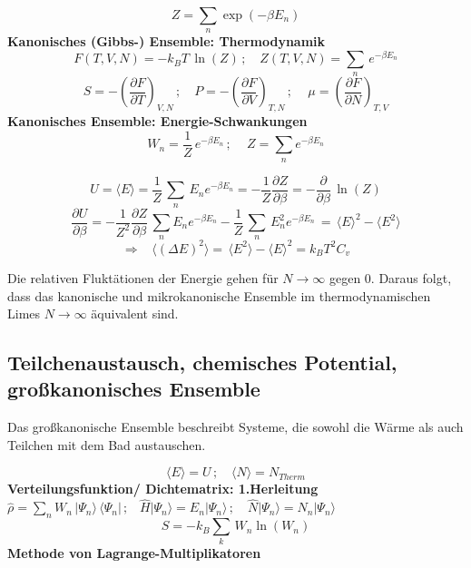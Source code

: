 \documentclass[a4paper,11pt]{scrartcl}
\begin{document}
$$ Z = \sum_n \exp(-\beta E_n) $$
\textbf{Kanonisches (Gibbs-) Ensemble: Thermodynamik}
\begin{equation}
 F(T,V,N) = - k_B T \, \ln(Z)\,; \,\,\,\,\,\, Z(T,V,N) = \sum_n \, e^{-\beta E_n}
\end{equation}
\begin{equation}
 S = - \left( \frac{\partial F}{\partial T} \right)_{V,N}\,;\,\,\,\,\,\, P = - \left( \frac{\partial F}{\partial V} \right)_{T,N}\,;\,\,\,\,\,\,\, \mu = \left( \frac{\partial F}{\partial N} \right)_{T,V}
\end{equation}
\textbf{Kanonisches Ensemble: Energie-Schwankungen}\\
\begin{equation}
 W_n= \frac{1}{Z}\, e^{-\beta E_n}\,;\,\,\,\,\,\,\, Z= \sum_n  e^{-\beta E_n}
\end{equation}

\begin{equation}
 U = \langle E \rangle = \frac{1}{Z} \, \sum_n \, E_n e^{-\beta E_n}= - \frac{1}{Z} \frac{\partial Z}{\partial \beta} =- \frac{\partial}{\partial \beta}\, \ln(Z)
\end{equation}
\begin{equation}
 \frac{\partial U}{\partial \beta} = - \frac{1}{Z^2} \frac{\partial Z}{\partial \beta}\, \sum_n E_n e^{-\beta E_n}- \frac{1}{Z} \, \sum_n \, E_n^2 e^{-\beta E_n}\, = \, \langle E \rangle^2- \langle E^2 \rangle
\end{equation}
\begin{equation}
 \Rightarrow \,\,\,\,\, \langle (\Delta E)^2 \rangle = \, \langle E^2 \rangle- \langle E \rangle^2 = k_B T^2 C_v
\end{equation}

Die relativen Fluktätionen der Energie gehen für $N \rightarrow \infty$ gegen 0.
Daraus folgt, dass das kanonische und mikrokanonische Ensemble im thermodynamischen Limes $N \rightarrow \infty$ äquivalent sind.
\subsection{Teilchenaustausch, chemisches Potential, großkanonisches Ensemble}
Das großkanonische Ensemble beschreibt Systeme, die sowohl die Wärme als auch Teilchen mit dem Bad austauschen.

$$\langle E \rangle = U\,; \,\,\,\,\,\, \langle N \rangle = N_{Therm}$$
\textbf{Verteilungsfunktion/ Dichtematrix: 1.Herleitung}\\
$\hat{\rho} = \sum_n W_n \, |\Psi_n \rangle \, \langle \Psi_n |\,;\,\,\,\,\, \hat{H} | \Psi_n \rangle = E_n | \Psi_n \rangle \, ;\,\,\,\,\,\, \hat{N} | \Psi_n \rangle  = N_n | \Psi_n \rangle $
\begin{equation}
 S = - k_B \sum_k \, W_n \ln(W_n)
\end{equation}
\textbf{Methode von Lagrange-Multiplikatoren}\\
\end{document}
